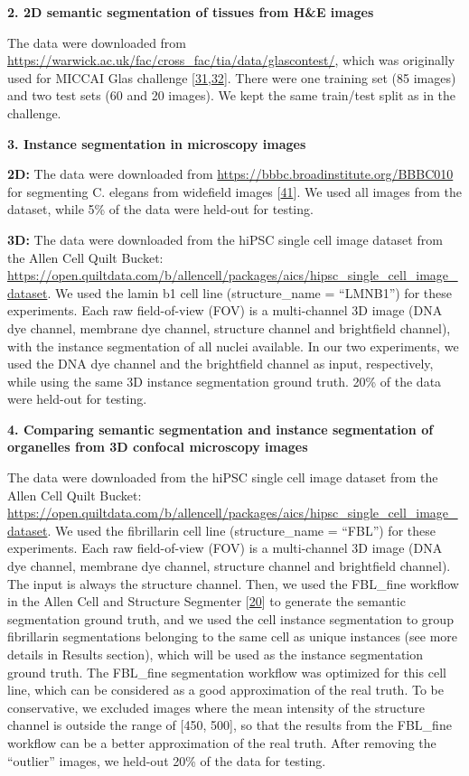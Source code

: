 \textbf{2. 2D semantic segmentation of tissues from H\&E images}

The data were downloaded from \url{https://warwick.ac.uk/fac/cross_fac/tia/data/glascontest/}, which was originally used for MICCAI Glas challenge {[}\protect\hyperlink{ref-45Sirz1X}{31},\protect\hyperlink{ref-XAffSYIR}{32}{]}. There were one training set (85 images) and two test sets (60 and 20 images). We kept the same train/test split as in the challenge.

\textbf{3. Instance segmentation in microscopy images}

\textbf{2D:} The data were downloaded from \url{https://bbbc.broadinstitute.org/BBBC010} for segmenting C. elegans from widefield images {[}\protect\hyperlink{ref-138foKNOh}{41}{]}. We used all images from the dataset, while 5\% of the data were held-out for testing.

\textbf{3D:} The data were downloaded from the hiPSC single cell image dataset from the Allen Cell Quilt Bucket: \url{https://open.quiltdata.com/b/allencell/packages/aics/hipsc_single_cell_image_dataset}. We used the lamin b1 cell line (structure\_name = ``LMNB1'') for these experiments. Each raw field-of-view (FOV) is a multi-channel 3D image (DNA dye channel, membrane dye channel, structure channel and brightfield channel), with the instance segmentation of all nuclei available. In our two experiments, we used the DNA dye channel and the brightfield channel as input, respectively, while using the same 3D instance segmentation ground truth. 20\% of the data were held-out for testing.

\textbf{4. Comparing semantic segmentation and instance segmentation of organelles from 3D confocal microscopy images}

The data were downloaded from the hiPSC single cell image dataset from the Allen Cell Quilt Bucket: \url{https://open.quiltdata.com/b/allencell/packages/aics/hipsc_single_cell_image_dataset}. We used the fibrillarin cell line (structure\_name = ``FBL'') for these experiments. Each raw field-of-view (FOV) is a multi-channel 3D image (DNA dye channel, membrane dye channel, structure channel and brightfield channel). The input is always the structure channel. Then, we used the FBL\_fine workflow in the Allen Cell and Structure Segmenter {[}\protect\hyperlink{ref-jM3v1UjQ}{20}{]} to generate the semantic segmentation ground truth, and we used the cell instance segmentation to group fibrillarin segmentations belonging to the same cell as unique instances (see more details in Results section), which will be used as the instance segmentation ground truth. The FBL\_fine segmentation workflow was optimized for this cell line, which can be considered as a good approximation of the real truth. To be conservative, we excluded images where the mean intensity of the structure channel is outside the range of {[}450, 500{]}, so that the results from the FBL\_fine workflow can be a better approximation of the real truth. After removing the ``outlier'' images, we held-out 20\% of the data for testing.

